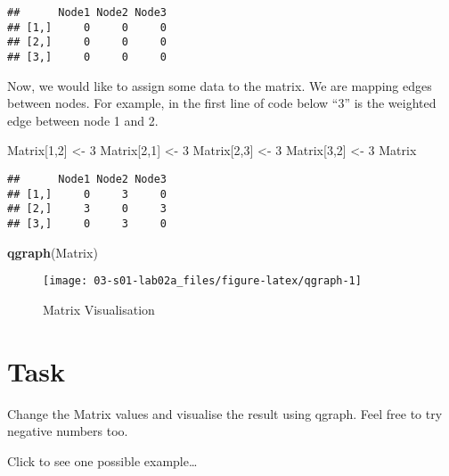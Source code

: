 \documentclass[]{book}
\newenvironment{Shaded}{\begin{snugshade}}{\end{snugshade}}
\newcommand{\DecValTok}[1]{\textcolor[rgb]{0.00,0.00,0.81}{#1}}
\newcommand{\KeywordTok}[1]{\textcolor[rgb]{0.13,0.29,0.53}{\textbf{#1}}}
\newcommand{\NormalTok}[1]{#1}
\newcommand{\StringTok}[1]{\textcolor[rgb]{0.31,0.60,0.02}{#1}}
\begin{document}
\begin{verbatim}
##      Node1 Node2 Node3
## [1,]     0     0     0
## [2,]     0     0     0
## [3,]     0     0     0
\end{verbatim}

Now, we would like to assign some data to the matrix. We are mapping edges between nodes. For example, in the first line of code below ``3'' is the weighted edge between node 1 and 2.

\begin{Shaded}
\begin{Highlighting}[]
\NormalTok{Matrix[}\DecValTok{1}\NormalTok{,}\DecValTok{2}\NormalTok{] <-}\StringTok{ }\DecValTok{3}
\NormalTok{Matrix[}\DecValTok{2}\NormalTok{,}\DecValTok{1}\NormalTok{] <-}\StringTok{ }\DecValTok{3}
\NormalTok{Matrix[}\DecValTok{2}\NormalTok{,}\DecValTok{3}\NormalTok{] <-}\StringTok{ }\DecValTok{3}
\NormalTok{Matrix[}\DecValTok{3}\NormalTok{,}\DecValTok{2}\NormalTok{] <-}\StringTok{ }\DecValTok{3}
\NormalTok{Matrix}
\end{Highlighting}
\end{Shaded}

\begin{verbatim}
##      Node1 Node2 Node3
## [1,]     0     3     0
## [2,]     3     0     3
## [3,]     0     3     0
\end{verbatim}

\begin{Shaded}
\begin{Highlighting}[]
\KeywordTok{qgraph}\NormalTok{(Matrix)}
\end{Highlighting}
\end{Shaded}

\begin{figure}

{\centering \texttt{[image: 03-s01-lab02a\_files/figure-latex/qgraph-1]} 

}

\caption{Matrix Visualisation}\label{fig:qgraph}
\end{figure}

\hypertarget{task}{%
\section{Task}\label{task}}

Change the Matrix values and visualise the result using qgraph. Feel free to try negative numbers too.

Click to see one possible example\ldots{}
\end{document}

